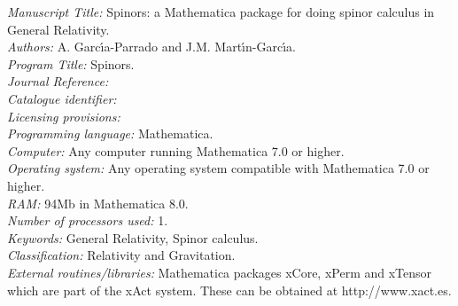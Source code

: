 \documentclass[final,3p,times,twocolumn]{elsarticle}
\newcounter{bla}
\begin{document}
\begin{small}
\noindent
{\em Manuscript Title:} Spinors: a Mathematica package for doing spinor calculus in General Relativity. \\
{\em Authors:} A. Garc\'{\i}a-Parrado and J.M. Mart\'{\i}n-Garc\'{\i}a. \\
{\em Program Title:} Spinors.                                  \\
{\em Journal Reference:}                                      \\
{\em Catalogue identifier:}                                   \\
{\em Licensing provisions:}                                   \\
{\em Programming language:} Mathematica.                        \\
{\em Computer:} Any computer running Mathematica 7.0 or higher. \\
{\em Operating system:} Any operating system compatible with Mathematica 7.0 or higher. \\
{\em RAM:} 94Mb in Mathematica 8.0.                                              \\
{\em Number of processors used:} 1.                             \\
{\em Keywords:} General Relativity, Spinor calculus.  \\
{\em Classification:} Relativity and Gravitation. \\
{\em External routines/libraries:} Mathematica packages xCore, xPerm and xTensor which are part 
of the xAct system. These can be obtained at http://www.xact.es.\\

\end{small}
\end{document}
